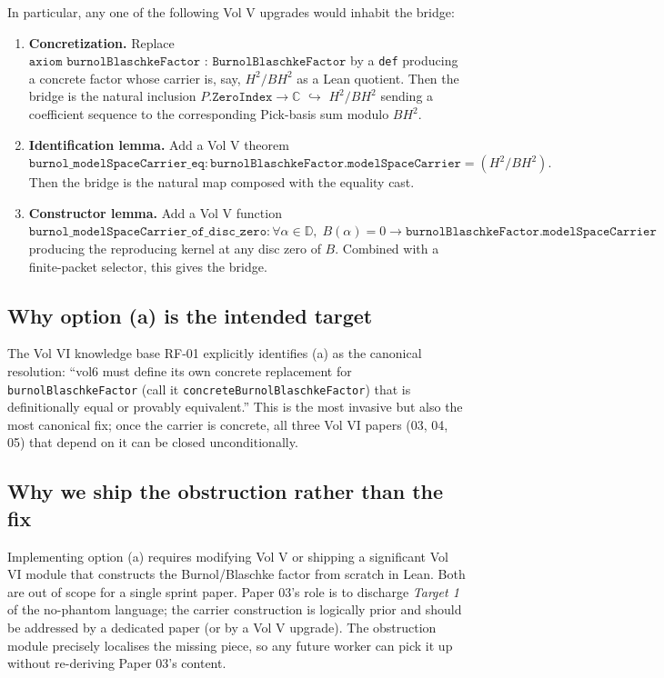 \documentclass[12pt]{article}
\theoremstyle{definition}
\theoremstyle{remark}
\newcommand{\C}{\mathbb{C}}
\newcommand{\Disc}{\mathbb{D}}
\newcommand{\HardyTwo}{H^{2}}
\newcommand{\BurnolFactor}{B}
\begin{document}
In particular, any one of the following Vol V upgrades would inhabit the
bridge:

\begin{enumerate}[label=(\alph*)]
\item \textbf{Concretization.} Replace
$\texttt{axiom burnolBlaschkeFactor : BurnolBlaschkeFactor}$ by a
\texttt{def} producing a concrete factor whose carrier is, say,
$\HardyTwo / \BurnolFactor\HardyTwo$ as a Lean quotient. Then the bridge
is the natural inclusion
$P.\texttt{ZeroIndex}\to\C$ \(\hookrightarrow\) $\HardyTwo / \BurnolFactor\HardyTwo$
sending a coefficient sequence to the corresponding Pick-basis sum modulo
$\BurnolFactor\HardyTwo$.

\item \textbf{Identification lemma.} Add a Vol V theorem
\(
\texttt{burnol\_modelSpaceCarrier\_eq}
:
\texttt{burnolBlaschkeFactor.modelSpaceCarrier}
=
(\HardyTwo / \BurnolFactor\HardyTwo).
\)
Then the bridge is the natural map composed with the equality cast.

\item \textbf{Constructor lemma.} Add a Vol V function
\(
\texttt{burnol\_modelSpaceCarrier\_of\_disc\_zero}
:
\forall \alpha\in\Disc,\;\BurnolFactor(\alpha)=0\to
\texttt{burnolBlaschkeFactor.modelSpaceCarrier}
\)
producing the reproducing kernel at any disc zero of $\BurnolFactor$.
Combined with a finite-packet selector, this gives the bridge.
\end{enumerate}

\subsection{Why option (a) is the intended target}

The Vol VI knowledge base RF-01 explicitly identifies (a) as the
canonical resolution: ``vol6 must define its own concrete replacement for
\texttt{burnolBlaschkeFactor} (call it
\texttt{concreteBurnolBlaschkeFactor}) that is definitionally equal or
provably equivalent.'' This is the most invasive but also the most
canonical fix; once the carrier is concrete, all three Vol VI papers
(03, 04, 05) that depend on it can be closed unconditionally.

\subsection{Why we ship the obstruction rather than the fix}

Implementing option (a) requires modifying Vol V or shipping a
significant Vol VI module that constructs the Burnol/Blaschke factor
from scratch in Lean. Both are out of scope for a single
sprint paper. Paper 03's role is to discharge \emph{Target 1} of the
no-phantom language; the carrier construction is logically prior and
should be addressed by a dedicated paper (or by a Vol V upgrade). The
obstruction module precisely localises the missing piece, so any future
worker can pick it up without re-deriving Paper 03's content.
\end{document}

